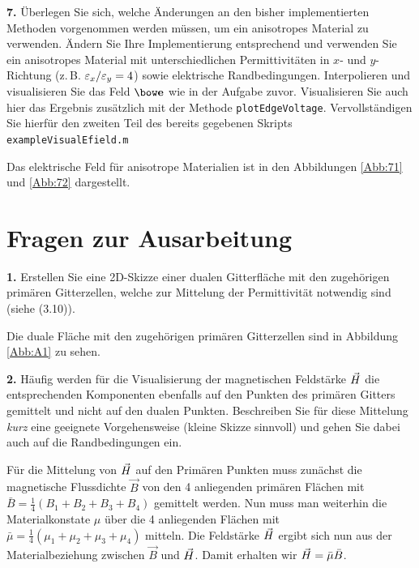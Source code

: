 \documentclass[Protokollheft.tex]{subfiles}
\begin{document}
\begin{framed}
	\noindent \textbf{7.} Überlegen Sie sich, welche Änderungen an den bisher implementierten Methoden 
vorgenommen werden müssen, um ein anisotropes Material zu verwenden. Ändern Sie 
Ihre Implementierung entsprechend und verwenden Sie ein anisotropes Material mit unterschiedlichen
Permittivitäten in $x$- und $y$-Richtung (z.\,B.
$\varepsilon_x / \varepsilon_y=4$) sowie elektrische
Randbedingungen. Interpolieren und visualisieren Sie das Feld
$\efit$ wie in der Aufgabe zuvor. Visualisieren Sie auch hier das Ergebnis zusätzlich mit der Methode \lstinline{plotEdgeVoltage}. Vervollständigen Sie hierfür den zweiten Teil des bereits gegebenen Skripts \lstinline{exampleVisualEfield.m}\label{exer:exampleVisualEfield2}\\
\end{framed}
\noindent
Das elektrische Feld für anisotrope Materialien ist in den Abbildungen \ref{Abb:71} und \ref{Abb:72} dargestellt.

\section{Fragen zur Ausarbeitung}

	\begin{framed}
	\noindent \textbf{1.} Erstellen Sie eine 2D-Skizze einer dualen
	Gitterfläche mit den zugehörigen primären Gitterzellen, welche
    zur Mittelung der Permittivität notwendig sind (siehe (3.10)).\label{exer:averagingEps}
\end{framed}
\noindent
Die duale Fläche mit den zugehörigen primären Gitterzellen sind in Abbildung \ref{Abb:A1} zu sehen.


	\begin{framed}
	\noindent \textbf{2.} Häufig werden für die Visualisierung der magnetischen Feldstärke
	$ \vec{H} $ die entsprechenden Komponenten ebenfalls auf den Punkten des
	primären Gitters gemittelt und nicht auf den dualen
	Punkten. Beschreiben Sie für diese Mittelung \emph{kurz} eine geeignete Vorgehensweise (kleine Skizze sinnvoll)
	und gehen Sie dabei auch auf die Randbedingungen ein.\label{exer:averageHfield}
\end{framed}
\noindent
Für die Mittelung von $ \vec{H} $ auf den Primären Punkten muss zunächst die magnetische Flussdichte $\vec{B}$ von den 4 anliegenden primären Flächen mit $\bar{B}=\frac{1}{4}(B_1+B_2+B_3+B_4)$ gemittelt werden. Nun muss man weiterhin die Materialkonstate $\mu$ über die 4 anliegenden  Flächen mit $\bar{\mu}=\frac{1}{4}(\mu_1+\mu_2+\mu_3+\mu_4)$ mitteln. Die Feldstärke $ \vec{H} $ ergibt sich nun aus der Materialbeziehung zwischen $\vec{B}$ und $ \vec{H} $. Damit erhalten wir $ \vec{H} =\bar{\mu}\bar{B}$. 
\end{document}
